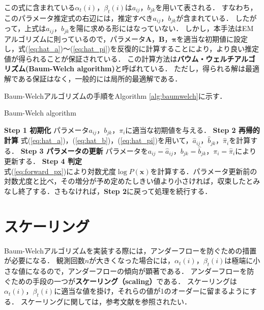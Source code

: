 \documentclass[a4j]{jarticle}
\begin{document}
この式に含まれている$\alpha_{t}(i)，\beta_{t}(i)$は$a_{ij}，b_{jk}$を用いて表される．
すなわち，このパラメータ推定式の右辺には，推定すべき$a_{ij}，b_{jk}$が含まれている．
したがって，上式は$a_{ij}，b_{jk}$を陽に求める形にはなっていない．
しかし，本手法はEMアルゴリズムに則っているので，パラメータ$\mathbf{A，B，}\bm{\pi}$を適当な初期値に設定し，式(\ref{eq:hat_a})〜(\ref{eq:hat_pi})を反復的に計算することにより，より良い推定値が得られることが保証されている．
この計算方法は\textbf{バウム・ウェルチアルゴリズム(Baum-Welch algorithm)}と呼ばれている\cite{zokupata, levinson1983introduction}．
ただし，得られる解は最適解である保証はなく，一般的には局所的最適解である．

Baum-Welchアルゴリズムの手順をAlgorithm \ref{alg:baumwelch}に示す．

\begin{algorithm}
		\caption{Baum-Welch algorithm}
		\label{alg:baumwelch}
		\begin{algorithmic}
			\STATE \textbf{Step 1 初期化}
			\STATE \quad パラメータ$a_{ij}，b_{jk}，\pi_{i}$に適当な初期値を与える．
			\STATE \textbf{Step 2 再帰的計算}
			\STATE \quad 式(\ref{eq:hat_a})，(\ref{eq:hat_b})，(\ref{eq:hat_pi})を用いて，$\hat{a}_{ij}，\hat{b}_{jk}，\hat{\pi}_{i}$を計算する．
			\STATE \textbf{Step 3 パラメータの更新}
			\STATE \quad パラメータを$a_{ij} = \hat{a}_{ij}，b_{jk} = \hat{b}_{jk}，\pi_{i} = \hat{\pi}_{i}$により更新する．
			\STATE \textbf{Step 4 判定} \\
			\STATE \quad 式(\ref{eq:forward_px})により対数尤度$\log P(\mathbf{x})$を計算する．パラメータ更新前の対数尤度と比べ，その増分が予め定めたしきい値より小さければ，収束したとみなし終了する．さもなければ，\textbf{Step 2}に戻って処理を続行する．
		\end{algorithmic}
\end{algorithm}

\newpage

\section{スケーリング}
Baum-Welchアルゴリズムを実装する際には，アンダーフローを防ぐための措置が必要になる．
観測回数$n$が大きくなった場合には，$\alpha_{t}(i)，\beta_{t}(i)$は極端に小さな値になるので，アンダーフローの傾向が顕著である．
アンダーフローを防ぐための手段の一つが\textbf{スケーリング（scaling）}である\cite{zokupata}．
スケーリングは$\alpha_{t}(i)，\beta_{t}(i)$に適当な値を掛け，それらの値が1のオーダーに留まるようにする．
スケーリングに関しては，参考文献\cite{scaling_hmm,PRLM_ge}を参照されたい．




\end{document}
